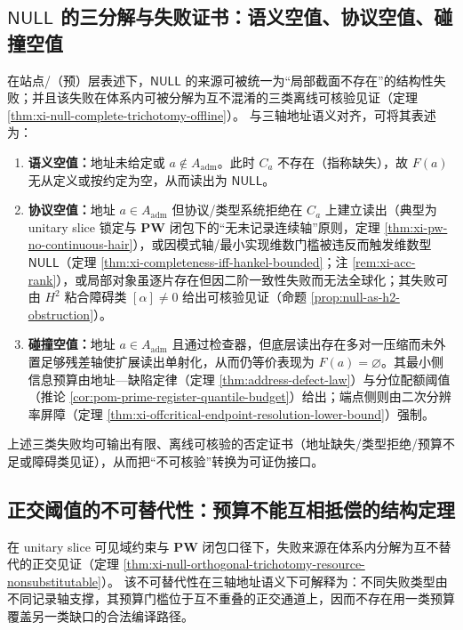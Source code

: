 \subsection{\texorpdfstring{$\mathsf{NULL}$}{NULL} 的三分解与失败证书：语义空值、协议空值、碰撞空值}\label{subsec:cdim-null-three-way}
在站点/（预）层表述下，\(\mathsf{NULL}\) 的来源可被统一为“局部截面不存在”的结构性失败；并且该失败在体系内可被分解为互不混淆的三类离线可核验见证（定理 \ref{thm:xi-null-complete-trichotomy-offline}）。
与三轴地址语义对齐，可将其表述为：
\begin{enumerate}
  \item \textbf{语义空值：}地址未给定或 \(a\notin A_{\mathrm{adm}}\)。此时 \(C_a\) 不存在（指称缺失），故 \(F(a)\) 无从定义或按约定为空，从而读出为 \(\mathsf{NULL}\)。
  \item \textbf{协议空值：}地址 \(a\in A_{\mathrm{adm}}\) 但协议/类型系统拒绝在 \(C_a\) 上建立读出（典型为 unitary slice 锁定与 \(\mathbf{PW}\) 闭包下的“无未记录连续轴”原则，定理 \ref{thm:xi-pw-no-continuous-hair}），或因模式轴/最小实现维数门槛被违反而触发维数型 \(\mathsf{NULL}\)（定理 \ref{thm:xi-completeness-iff-hankel-bounded}；注 \ref{rem:xi-acc-rank}），或局部对象虽逐片存在但因二阶一致性失败而无法全球化；其失败可由 \(H^2\) 粘合障碍类 \([\alpha]\neq 0\) 给出可核验见证（命题 \ref{prop:null-as-h2-obstruction}）。
  \item \textbf{碰撞空值：}地址 \(a\in A_{\mathrm{adm}}\) 且通过检查器，但底层读出存在多对一压缩而未外置足够残差轴使扩展读出单射化，从而仍等价表现为 \(F(a)=\varnothing\)。其最小侧信息预算由地址—缺陷定律（定理 \ref{thm:address-defect-law}）与分位配额阈值（推论 \ref{cor:pom-prime-register-quantile-budget}）给出；端点侧则由二次分辨率屏障（定理 \ref{thm:xi-offcritical-endpoint-resolution-lower-bound}）强制。
\end{enumerate}
上述三类失败均可输出有限、离线可核验的否定证书（地址缺失/类型拒绝/预算不足或障碍类见证），从而把“不可核验”转换为可证伪接口。

\subsection{正交阈值的不可替代性：预算不能互相抵偿的结构定理}\label{subsec:cdim-orthogonal-threshold-nonsubstitutable}
在 unitary slice 可见域约束与 \(\mathbf{PW}\) 闭包口径下，失败来源在体系内分解为互不替代的正交见证（定理 \ref{thm:xi-null-orthogonal-trichotomy-resource-nonsubstitutable}）。
该不可替代性在三轴地址语义下可解释为：不同失败类型由不同记录轴支撑，其预算门槛位于互不重叠的正交通道上，因而不存在用一类预算覆盖另一类缺口的合法编译路径。

